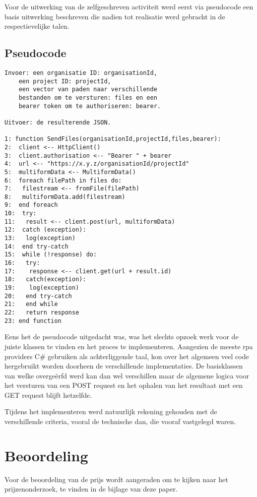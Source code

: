 Voor de uitwerking van de zelfgeschreven activiteit werd eerst via pseudocode een basis uitwerking beschreven die nadien tot realisatie werd gebracht in de respectievelijke talen.

\subsection{Pseudocode}
\begin{lstlisting}
Invoer: een organisatie ID: organisationId, 
	een project ID: projectId,
	een vector van paden naar verschillende 
	bestanden om te versturen: files en een 
	bearer token om te authoriseren: bearer.
	
Uitvoer: de resulterende JSON.

1: function SendFiles(organisationId,projectId,files,bearer):
2:  client <-- HttpClient()
3:  client.authorisation <-- "Bearer " + bearer
4:  url <-- "https://x.y.z/organisationId/projectId"
5:  multiformData <-- MultiformData()
6:  foreach filePath in files do:
7:   filestream <-- fromFile(filePath)
8:   multiformData.add(filestream)
9:  end foreach
10:  try:
11:   result <-- client.post(url, multiformData)
12:  catch (exception):
13:   log(exception)
14:  end try-catch
15:  while (!response) do:
16:   try:
17:    response <-- client.get(url + result.id)
18:   catch(exception):
19:    log(exception)
20:   end try-catch
21:   end while
22:   return response
23: end function
\end{lstlisting}

Eens het de pseudocode uitgedacht was, was het slechts opzoek werk voor de juiste klassen te vinden en het proces te implementeren. Aangezien de meeste \acrshort{rpa} providers C\# gebruiken als achterliggende taal, kon over het algemeen veel code hergebruikt worden doorheen de verschillende implementaties. De basisklassen van welke overgeërfd werd kan dan wel verschillen maar de algemene logica voor het versturen van een POST request en het ophalen van het resultaat met een GET request blijft hetzelfde.

Tijdens het implementeren werd natuurlijk rekening gehouden met de verschillende criteria, vooral de technische dan, die vooraf vastgelegd waren.

\section{Beoordeling}
Voor de beoordeling van de prijs wordt aangeraden om te kijken naar het prijzenonderzoek, te vinden in de bijlage van deze paper.

